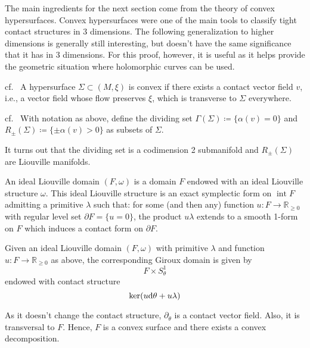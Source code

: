 The main ingredients for the next section come from the theory of convex hypersurfaces.
Convex hypersurfaces were one of the main tools to classify tight contact structures in 3 dimensions.
The following generalization to higher dimensions is generally still interesting, but doesn't have the same
significance that it has in 3 dimensions. For this proof, however, it is useful as it helps provide
the geometric situation where holomorphic curves can be used.

\begin{definition}cf.~\cite[Definition 1.1.4]{HH19}
    A hypersurface $\Sigma \subset (M, \xi)$ is convex if there exists a contact
    vector field $v$, i.e., a vector field whose flow preserves $\xi$, which is transverse to $\Sigma$
    everywhere.
\end{definition}

\begin{definition}cf.~\cite[Definition 1.2.1]{HH19}
    With notation as above, define the dividing set $\Gamma(\Sigma) \coloneqq \{\alpha(v) = 0\}$ and $R_\pm(\Sigma) \coloneqq \{\pm \alpha(v) > 0\}$ 
    as subsets of $\Sigma$.
\end{definition}
It turns out that the dividing set is a codimension 2 submanifold and $R_\pm(\Sigma)$ are Liouville manifolds.

\begin{definition} \cite[Definition 1]{Giroux20}
An ideal Liouville domain
$(F, \omega)$ is a domain $F$ endowed with an ideal Liouville structure $\omega$. This
ideal Liouville structure is an exact symplectic form on $\operatorname{int} F$
admitting a primitive $\lambda$ such that: for some (and then any) function 
$u \colon F \to \mathbb R_{\geq 0}$  with regular level set $\partial F = \{u = 0\}$,
the product $u\lambda$ extends to a smooth 1-form on $F$ which 
induces a contact form on $\partial F$.
\end{definition}

\begin{definition}\cite[Section 5.3]{MNW13}
    \label{def:giroux_domain}
    Given an ideal Liouville domain $(F, \omega)$ with primitive $\lambda$
    and function $u \colon F \to \mathbb R_{\geq 0}$ as above,
    the corresponding Giroux domain is given by
    \[
        F \times S^1_\theta
    \]
    endowed with contact structure
    \[
        \ker(u \mathrm{d} \theta + u \lambda)
    \]
\end{definition}
As it doesn't change the contact structure, $\partial_\theta$ is a contact vector field.
Also, it is transversal to $F$. Hence, $F$ is a convex surface and there exists a convex decomposition.

